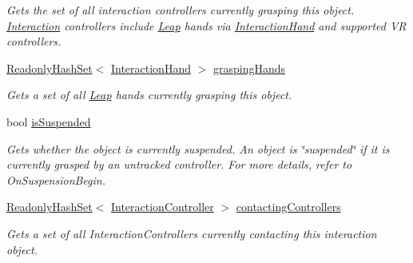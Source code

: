 \begin{DoxyCompactItemize}
\begin{DoxyCompactList}\small\item\em Gets the set of all interaction controllers currently grasping this object. \mbox{\hyperlink{namespace_leap_1_1_unity_1_1_interaction}{Interaction}} controllers include \mbox{\hyperlink{namespace_leap_1_1_unity_1_1_leap}{Leap}} hands via \mbox{\hyperlink{class_leap_1_1_unity_1_1_interaction_1_1_interaction_hand}{Interaction\+Hand}} and supported VR controllers. \end{DoxyCompactList}\item 
\mbox{\hyperlink{struct_leap_1_1_unity_1_1_readonly_hash_set}{Readonly\+Hash\+Set}}$<$ \mbox{\hyperlink{class_leap_1_1_unity_1_1_interaction_1_1_interaction_hand}{Interaction\+Hand}} $>$ \mbox{\hyperlink{class_leap_1_1_unity_1_1_interaction_1_1_interaction_behaviour_a71688234e7a4bec485b5f79e3ca49098}{grasping\+Hands}}
\begin{DoxyCompactList}\small\item\em Gets a set of all \mbox{\hyperlink{namespace_leap_1_1_unity_1_1_leap}{Leap}} hands currently grasping this object. \end{DoxyCompactList}\item 
bool \mbox{\hyperlink{class_leap_1_1_unity_1_1_interaction_1_1_interaction_behaviour_abd55576df7341d169cbe23eebacc35c5}{is\+Suspended}}
\begin{DoxyCompactList}\small\item\em Gets whether the object is currently suspended. An object is \char`\"{}suspended\char`\"{} if it is currently grasped by an untracked controller. For more details, refer to On\+Suspension\+Begin. \end{DoxyCompactList}\item 
\mbox{\hyperlink{struct_leap_1_1_unity_1_1_readonly_hash_set}{Readonly\+Hash\+Set}}$<$ \mbox{\hyperlink{class_leap_1_1_unity_1_1_interaction_1_1_interaction_controller}{Interaction\+Controller}} $>$ \mbox{\hyperlink{class_leap_1_1_unity_1_1_interaction_1_1_interaction_behaviour_a5bf2a4d57f21997852f8cf431e517f3f}{contacting\+Controllers}}
\begin{DoxyCompactList}\small\item\em Gets a set of all Interaction\+Controllers currently contacting this interaction object. \end{DoxyCompactList}\item 

\end{DoxyCompactItemize}
